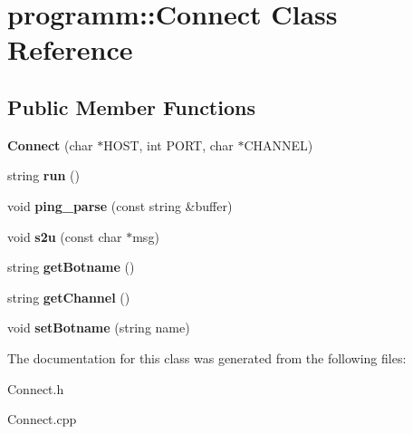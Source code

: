 \hypertarget{classprogramm_1_1Connect}{\section{programm\-:\-:\-Connect \-Class \-Reference}
\label{classprogramm_1_1Connect}
}
\subsection*{\-Public \-Member \-Functions}
\begin{DoxyCompactItemize}
\item 
\hypertarget{classprogramm_1_1Connect_a7053125ff50def421f2344062b44d5d7}{{\bfseries \-Connect} (char $\ast$\-H\-O\-S\-T, int \-P\-O\-R\-T, char $\ast$\-C\-H\-A\-N\-N\-E\-L)}\label{classprogramm_1_1Connect_a7053125ff50def421f2344062b44d5d7}

\item 
\hypertarget{classprogramm_1_1Connect_a3f4b6b21e9cb516cbcec354f64e811c8}{string {\bfseries run} ()}\label{classprogramm_1_1Connect_a3f4b6b21e9cb516cbcec354f64e811c8}

\item 
\hypertarget{classprogramm_1_1Connect_af000d58344d858db7042ecc05ab2c11a}{void {\bfseries ping\-\_\-parse} (const string \&buffer)}\label{classprogramm_1_1Connect_af000d58344d858db7042ecc05ab2c11a}

\item 
\hypertarget{classprogramm_1_1Connect_ab3cee879c5594b1f6252d42180d17eb0}{void {\bfseries s2u} (const char $\ast$msg)}\label{classprogramm_1_1Connect_ab3cee879c5594b1f6252d42180d17eb0}

\item 
\hypertarget{classprogramm_1_1Connect_a2f482d2914eddae0b4cb9294f1a8a27c}{string {\bfseries get\-Botname} ()}\label{classprogramm_1_1Connect_a2f482d2914eddae0b4cb9294f1a8a27c}

\item 
\hypertarget{classprogramm_1_1Connect_ad71ab1cf7e351225779abaef8f0ef5da}{string {\bfseries get\-Channel} ()}\label{classprogramm_1_1Connect_ad71ab1cf7e351225779abaef8f0ef5da}

\item 
\hypertarget{classprogramm_1_1Connect_ac6f794325af90bec71cf68169d933be0}{void {\bfseries set\-Botname} (string name)}\label{classprogramm_1_1Connect_ac6f794325af90bec71cf68169d933be0}

\end{DoxyCompactItemize}


\-The documentation for this class was generated from the following files\-:\begin{DoxyCompactItemize}
\item 
\-Connect.\-h\item 
\-Connect.\-cpp\end{DoxyCompactItemize}

